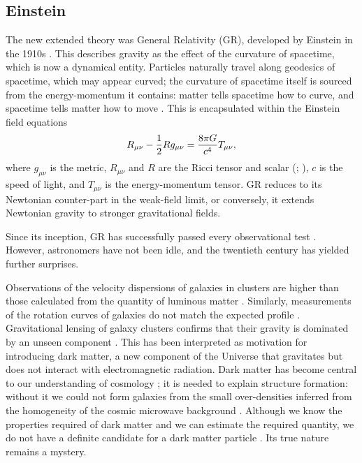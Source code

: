 \subsection{Einstein}

The new extended theory was General Relativity (GR), developed by Einstein in the 1910s \citep{Einstein1997}. This describes gravity as the effect of the curvature of spacetime, which is now a dynamical entity. Particles naturally travel along geodesics of spacetime, which may appear curved; the curvature of spacetime itself is sourced from the energy-momentum it contains: matter tells spacetime how to curve, and spacetime tells matter how to move \citep[section 1.1]{Misner1973}. This is encapsulated within the Einstein field equations \citep[documents 22 and 25]{Einstein1997}
\begin{equation}
R_{\mu\nu} - \frac{1}{2}R g_{\mu\nu} = \frac{8\pi G}{c^4}T_{\mu\nu},
\end{equation}
where $g_{\mu\nu}$ is the metric, $R_{\mu\nu}$ and $R$ are the Ricci tensor and scalar (\citealt[section 8.7]{Misner1973}; \citealt[section 3.2]{Wald1984}), $c$ is the speed of light, and $T_{\mu\nu}$ is the energy-momentum tensor. GR reduces to its Newtonian counter-part in the weak-field limit, or conversely, it extends Newtonian gravity to stronger gravitational fields.

Since its inception, GR has successfully passed every observational test \citep{Will1993, Will2006}. However, astronomers have not been idle, and the twentieth century has yielded further surprises.

Observations of the velocity dispersions of galaxies in clusters are higher than those calculated from the quantity of luminous matter \citep[e.g.,][]{Zwicky1937}. Similarly, measurements of the rotation curves of galaxies do not match the expected profile \citep{Babcock1939}. Gravitational lensing of galaxy clusters confirms that their gravity is dominated by an unseen component \citep{Bergmann1990,Clowe2006}. This has been interpreted as motivation for introducing dark matter, a new component of the Universe that gravitates but does not interact with electromagnetic radiation. Dark matter has become central to our understanding of cosmology \citep[e.g.,][]{Springel2006a}; it is needed to explain structure formation: without it we could not form galaxies from the small over-densities inferred from the homogeneity of the cosmic microwave background \citep{White1978,Liddle1993}. Although we know the properties required of dark matter and we can estimate the required quantity, we do not have a definite candidate for a dark matter particle \citep{Bertone2005}. Its true nature remains a mystery.


